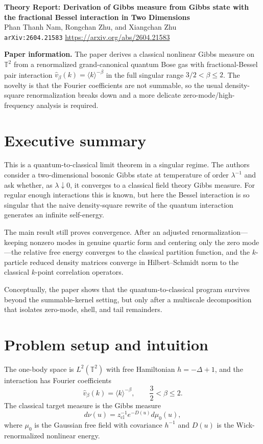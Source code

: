 \documentclass[11pt]{article}
\begin{document}
\begin{center}
{\Large \textbf{Theory Report: Derivation of Gibbs measure from Gibbs state with the fractional Bessel interaction in Two Dimensions}}\\[0.5em]
{\large Phan Thanh Nam, Rongchan Zhu, and Xiangchan Zhu}\\[0.25em]
\texttt{arXiv:2604.21583} \quad \url{https://arxiv.org/abs/2604.21583}
\end{center}

\textbf{Paper information.} The paper derives a classical nonlinear Gibbs measure on $\mathbb T^2$ from a renormalized grand-canonical quantum Bose gas with fractional-Bessel pair interaction $\widehat v_\beta(k)=\langle k\rangle^{-\beta}$ in the full singular range $3/2<\beta\le 2$. The novelty is that the Fourier coefficients are not summable, so the usual density-square renormalization breaks down and a more delicate zero-mode/high-frequency analysis is required.

\section*{Executive summary}
This is a quantum-to-classical limit theorem in a singular regime. The authors consider a two-dimensional bosonic Gibbs state at temperature of order $\lambda^{-1}$ and ask whether, as $\lambda\downarrow0$, it converges to a classical field theory Gibbs measure. For regular enough interactions this is known, but here the Bessel interaction is so singular that the naive density-square rewrite of the quantum interaction generates an infinite self-energy.

The main result still proves convergence. After an adjusted renormalization---keeping nonzero modes in genuine quartic form and centering only the zero mode---the relative free energy converges to the classical partition function, and the $k$-particle reduced density matrices converge in Hilbert--Schmidt norm to the classical $k$-point correlation operators.

Conceptually, the paper shows that the quantum-to-classical program survives beyond the summable-kernel setting, but only after a multiscale decomposition that isolates zero-mode, shell, and tail remainders.

\section*{Problem setup and intuition}
The one-body space is $L^2(\mathbb T^2)$ with free Hamiltonian $h=-\Delta+1$, and the interaction has Fourier coefficients
\[
\widehat v_\beta(k)=\langle k\rangle^{-\beta},\qquad \frac32<\beta\le 2.
\]
The classical target measure is the Gibbs measure
\[
 d\nu(u)=z_{\mathrm{cl}}^{-1}e^{-D(u)}d\mu_0(u),
\]
where $\mu_0$ is the Gaussian free field with covariance $h^{-1}$ and $D(u)$ is the Wick-renormalized nonlinear energy.
\end{document}
